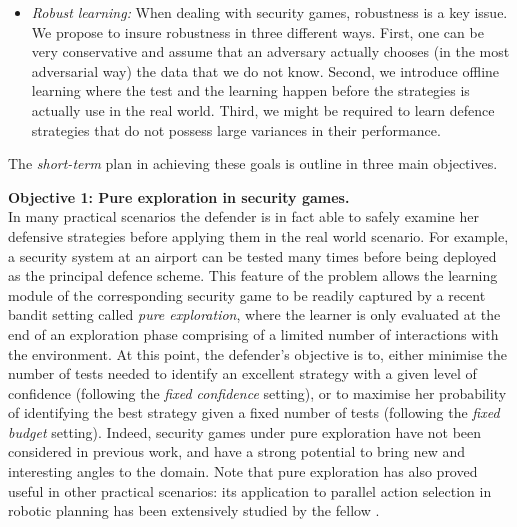 \begin{itemize}
\item \textit{Robust learning:} When dealing with security games, robustness is a key issue. We propose to insure robustness in  three different ways. First, one can be  very conservative and assume that an adversary actually chooses (in the most adversarial way) the data that we do not know. Second, we introduce offline learning  where the test and the learning happen  before the strategies is actually use in the real world. Third, we might be required to learn defence strategies that do not possess large variances in their performance. 
\end{itemize}
The \textit{short-term} plan in achieving these goals is outline in three main objectives.

\textbf{Objective 1: Pure exploration in security games.}\\
In many practical scenarios the defender is in fact able to safely examine her defensive strategies before applying them in the real world scenario. For example, a security system at an airport can be tested many times before being deployed as the principal defence scheme. This feature of the problem allows the learning module of the corresponding security game to be readily captured by a recent bandit setting called \textit{pure exploration}, where the learner is only evaluated at the end of an exploration phase comprising of a limited number of interactions with the environment. 
At this point, the defender's objective is to, either minimise the number of tests needed to identify an excellent strategy with a given level of confidence
(following the \textit{fixed confidence} setting\cite{Maron93HR,Even-Dar06AE}), or to maximise her probability of identifying the best strategy given a fixed number of tests (following the \textit{fixed budget} setting\cite{Bubeck09PE,Audibert10BA}).
Indeed, security games under pure exploration have not been considered in previous work, and have a strong potential to bring new and interesting angles to the domain. Note that pure exploration has also proved useful in other practical scenarios: its application to parallel action selection in robotic planning has been extensively studied by the fellow \cite{Gabillon11MB}.
%
%

